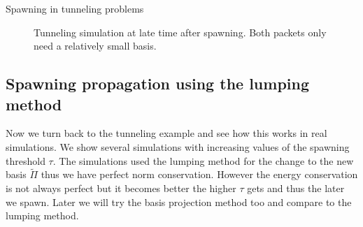 \begin{chapter}{Spawning in tunneling problems}
\begin{figure}[h!]
  \centering
  \caption[Tunneling simulation at different times]{
  Tunneling simulation at late time after spawning. Both packets only need a
  relatively small basis.}
  \label{fig:spawning_propagation_intro3}
\end{figure}


\subsection{Spawning propagation using the lumping method}

Now we turn back to the tunneling example and see how this works in real simulations.
We show several simulations with increasing values of the spawning threshold $\tau$.
The simulations used the lumping method for the change to the new basis $\tilde{\Pi}$
thus we have perfect norm conservation. However the energy conservation is not always
perfect but it becomes better the higher $\tau$ gets and thus the later we spawn.
Later we will try the basis projection method too and compare to the lumping method.



\end{chapter}
